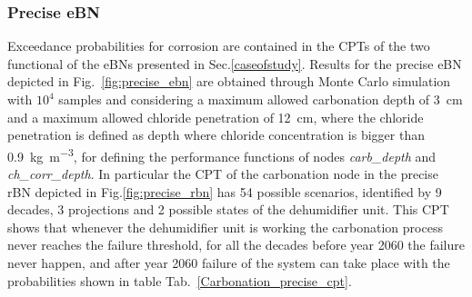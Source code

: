 \subsubsection{Precise eBN}
Exceedance probabilities for corrosion are contained in the CPTs of the two functional of the eBNs presented in Sec.\ref{caseofstudy}. 
Results for the precise eBN depicted in Fig.~\ref{fig:precise_ebn} are obtained through Monte Carlo simulation with $10^4$ samples and considering a maximum allowed carbonation depth of \SI{3}{\centi\meter} and a maximum allowed chloride penetration of \SI{12}{\centi\meter}, where the chloride penetration is defined as depth where chloride concentration is bigger than \SI{0.9}{\kilogram\per\cubic\meter}, for defining the performance functions of nodes \textit{carb_depth} and \textit{ch_corr_depth}.
In particular the CPT of the carbonation node in the precise rBN depicted in Fig.\ref{fig:precise_rbn} has 54 possible scenarios, identified by 9 decades, 3 projections and 2 possible states of the dehumidifier unit. This CPT shows that whenever the dehumidifier unit is working the carbonation process never reaches the failure threshold, for all the decades before year 2060 the failure never happen, and after year 2060 failure of the system can take place with the probabilities shown in table Tab.~\ref{Carbonation_precise_cpt}.

